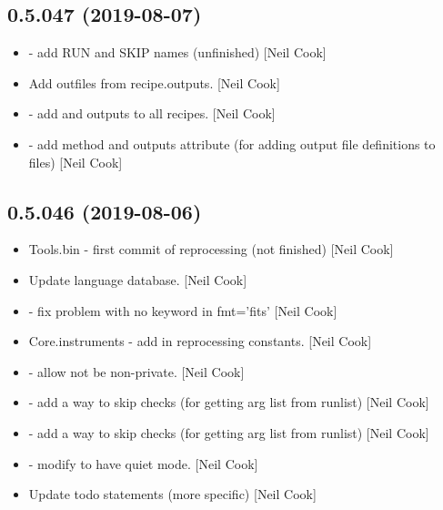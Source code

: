 \documentclass[a4paper,10pt,english]{report}
\begin{document}
\subsection{0.5.047 (2019-08-07)}
\label{\detokenize{misc/changelog:id95}}\begin{itemize}
\item {} 
 - add RUN and SKIP names (unfinished) {[}Neil Cook{]}

\item {} 
Add outfiles from recipe.outputs. {[}Neil Cook{]}

\item {} 
 - add  and outputs to all recipes.
{[}Neil Cook{]}

\item {} 
 - add  method and outputs attribute (for
adding output file definitions to files) {[}Neil Cook{]}

\end{itemize}


\subsection{0.5.046 (2019-08-06)}
\label{\detokenize{misc/changelog:id96}}\begin{itemize}
\item {} 
Tools.bin - first commit of reprocessing (not finished) {[}Neil Cook{]}

\item {} 
Update language database. {[}Neil Cook{]}

\item {} 
 - fix problem with no  keyword in fmt=’fits’
{[}Neil Cook{]}

\item {} 
Core.instruments - add in reprocessing constants. {[}Neil Cook{]}

\item {} 
 - allow  not be non-private. {[}Neil
Cook{]}

\item {} 
 - add a way to skip checks (for getting arg
list from runlist) {[}Neil Cook{]}

\item {} 
 - add a way to skip checks (for getting arg
list from runlist) {[}Neil Cook{]}

\item {} 
 - modify  to have
quiet mode. {[}Neil Cook{]}

\item {} 
Update todo statements (more specific) {[}Neil Cook{]}

\end{itemize}
\end{document}
